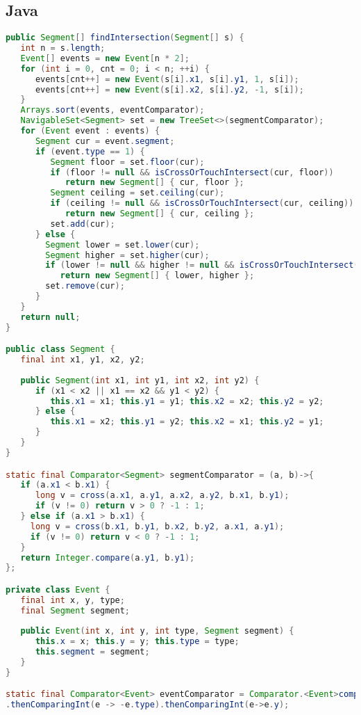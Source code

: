 \subsection{Java}
\begin{lstlisting}[language=Java]
public Segment[] findIntersection(Segment[] s) {
   int n = s.length;
   Event[] events = new Event[n * 2];
   for (int i = 0, cnt = 0; i < n; ++i) {
      events[cnt++] = new Event(s[i].x1, s[i].y1, 1, s[i]);
      events[cnt++] = new Event(s[i].x2, s[i].y2, -1, s[i]);
   }
   Arrays.sort(events, eventComparator);
   NavigableSet<Segment> set = new TreeSet<>(segmentComparator);
   for (Event event : events) {
      Segment cur = event.segment;
      if (event.type == 1) {
         Segment floor = set.floor(cur);
         if (floor != null && isCrossOrTouchIntersect(cur, floor))
            return new Segment[] { cur, floor };
         Segment ceiling = set.ceiling(cur);
         if (ceiling != null && isCrossOrTouchIntersect(cur, ceiling))
            return new Segment[] { cur, ceiling };
         set.add(cur);
      } else {
        Segment lower = set.lower(cur);
        Segment higher = set.higher(cur);
        if (lower != null && higher != null && isCrossOrTouchIntersect(lower, higher))
           return new Segment[] { lower, higher };
        set.remove(cur);
      }
   }
   return null;
}

public class Segment {
   final int x1, y1, x2, y2;
	
   public Segment(int x1, int y1, int x2, int y2) {
      if (x1 < x2 || x1 == x2 && y1 < y2) {
         this.x1 = x1; this.y1 = y1; this.x2 = x2; this.y2 = y2;
      } else {
         this.x1 = x2; this.y1 = y2; this.x2 = x1; this.y2 = y1;
      }
   }
}

static final Comparator<Segment> segmentComparator = (a, b)->{
   if (a.x1 < b.x1) {
      long v = cross(a.x1, a.y1, a.x2, a.y2, b.x1, b.y1);
      if (v != 0) return v > 0 ? -1 : 1;
   } else if (a.x1 > b.x1) {
     long v = cross(b.x1, b.y1, b.x2, b.y2, a.x1, a.y1);
     if (v != 0) return v < 0 ? -1 : 1;
   }
   return Integer.compare(a.y1, b.y1);
};

private class Event {
   final int x, y, type;
   final Segment segment;
   
   public Event(int x, int y, int type, Segment segment) {
      this.x = x; this.y = y; this.type = type;
      this.segment = segment;
   }
}

static final Comparator<Event> eventComparator = Comparator.<Event>comparingInt(e->e.x)
.thenComparingInt(e -> -e.type).thenComparingInt(e->e.y);


\end{lstlisting}
